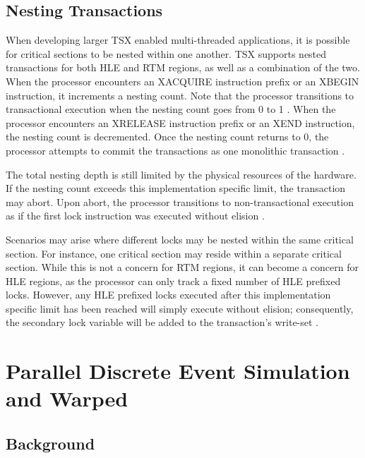 \documentclass[a4paper]{article}
\begin{document}
\subsection{\textbf{Nesting Transactions}}

\indent
When developing larger TSX enabled multi-threaded applications, it is
possible for critical sections to be nested within one another.  TSX supports
nested transactions for both HLE and RTM regions, as well as a combination of
the two.  When the processor encounters an XACQUIRE instruction prefix or an 
XBEGIN instruction, it increments a nesting count.  Note that the processor
transitions to transactional execution when the nesting count goes from 0 to 1
\cite{intel_prog_ref}.  When the processor encounters an XRELEASE instruction
prefix or an XEND instruction, the nesting count is decremented.  Once the
nesting count returns to 0, the processor attempts to commit the transactions as
one monolithic transaction \cite{intel_prog_ref}.
\par

\indent
The total nesting depth is still limited by the physical resources of
the hardware.  If the nesting count exceeds this implementation specific limit,
the transaction may abort.  Upon abort, the processor transitions to
non-transactional execution as if the first lock instruction was executed
without elision \cite{intel_prog_ref}.
\par

\indent
Scenarios may arise where different locks may be nested within the same
critical section.  For instance, one critical section may reside within a
separate critical section.  While this is not a concern for RTM regions, it can
become a concern for HLE regions, as the processor can only track a fixed number
of HLE prefixed locks.  However, any HLE prefixed locks executed after this
implementation specific limit has been reached will simply execute without
elision; consequently, the secondary lock variable will be added to the
transaction's write-set \cite{intel_prog_ref}.
\par

\newpage
\section{\textbf{Parallel Discrete Event Simulation and Warped}}

\subsection{\textbf{Background}}
\end{document}
